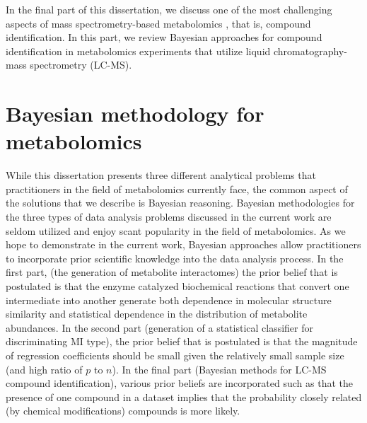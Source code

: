\begin{DoubleSpace*}
In the final part of this dissertation, we discuss one of the most challenging aspects of mass spectrometry-based metabolomics \cite{dunn2012}, that is, compound identification. In this part, we review Bayesian approaches for compound identification in metabolomics experiments that utilize liquid chromatography-mass spectrometry (LC-MS).

\section{Bayesian methodology for metabolomics}
While this dissertation presents three different analytical problems that practitioners in the field of metabolomics currently face, the common aspect of the solutions that we describe is Bayesian reasoning. Bayesian methodologies for the three types of data analysis problems discussed in the current work are seldom utilized and enjoy scant popularity in the field of metabolomics. As we hope to demonstrate in the current work, Bayesian approaches allow practitioners to incorporate prior scientific knowledge into the data analysis process. In the first part, (the generation of metabolite interactomes) the prior belief that is postulated is that the enzyme catalyzed biochemical reactions that convert one intermediate into another generate both dependence in molecular structure similarity and statistical dependence in the distribution of metabolite abundances. In the second part (generation of a statistical classifier for discriminating MI type), the prior belief that is postulated is that the magnitude of regression coefficients should be small given the relatively small sample size (and high ratio of $p$ to $n$). In the final part (Bayesian methods for LC-MS compound identification), various prior beliefs are incorporated such as that the presence of one compound in a dataset implies that the probability closely related (by chemical modifications) compounds is more likely. 


\end{DoubleSpace*}

